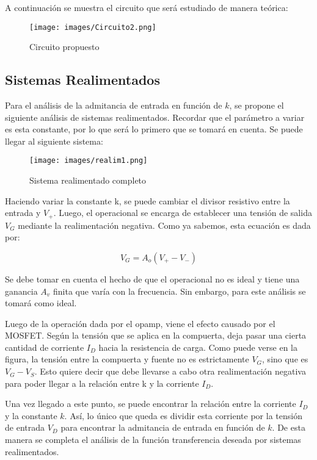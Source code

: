 \documentclass[12pt,oneside,a4paper]{article}
\begin{document}
A continuación se muestra el circuito que será estudiado de manera teórica:

\begin{figure}[H]
    \centering
    \texttt{[image: images/Circuito2.png]}
    \caption{Circuito propuesto}
\end{figure}

\subsection*{Sistemas Realimentados}
Para el análisis de la admitancia de entrada en función de $k$, se propone el siguiente análisis de 
sistemas realimentados. Recordar que el parámetro a variar es esta constante, por lo que será lo 
primero que se tomará en cuenta. Se puede llegar al siguiente sistema:

\begin{figure}[H]
    \centering
    \texttt{[image: images/realim1.png]}
    \caption{Sistema realimentado completo}
\end{figure}

\newpage
Haciendo variar la constante k, se puede cambiar el divisor resistivo entre la entrada y $V_+$. Luego, el 
operacional se encarga de establecer una tensión de salida $V_G$ mediante la realimentación negativa. 
Como ya sabemos, esta ecuación es dada por:

\begin{equation}
    V_G = A_o(V_+ - V_{-})
\end{equation}

Se debe tomar en cuenta el hecho de que el operacional no es ideal y tiene una ganancia $A_v$ finita que 
varía con la frecuencia. Sin embargo, para este análisis se tomará como ideal.

Luego de la operación dada por el opamp, viene el efecto causado por el MOSFET. Según la tensión
que se aplica en la compuerta, deja pasar una cierta cantidad de corriente $I_D$ hacia la resistencia 
de carga. Como puede verse en la figura, la tensión entre la compuerta y fuente no es estrictamente $V_G$, sino 
que es $V_G - V_S$. Esto quiere decir que debe llevarse a cabo otra realimentación negativa para 
poder llegar a la relación entre k y la corriente $I_D$. 

Una vez llegado a este punto, se puede encontrar la relación entre la corriente $I_D$ y la constante $k$.
Así, lo único que queda es dividir esta corriente por la tensión de entrada $V_D$ para encontrar la 
admitancia de entrada en función de $k$. De esta manera se completa el análisis de la función transferencia 
deseada por sistemas realimentados.
\end{document}
